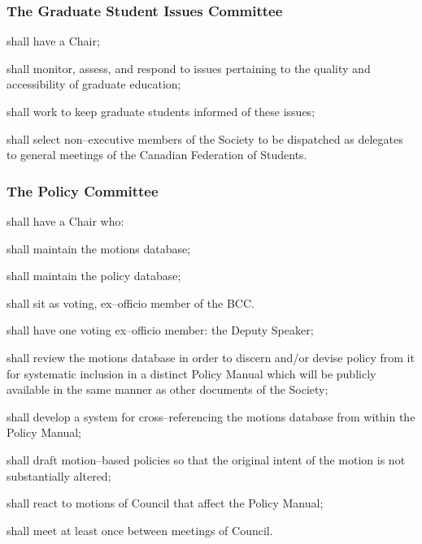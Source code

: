 \subsubsection{The Graduate Student Issues Committee}
\begin{longenum}[ label*=\thesubsubsection.\arabic*., align=left]
	\item shall have a Chair;
    \item shall monitor, assess, and respond to issues pertaining to the quality and accessibility of graduate education;
    \item shall work to keep graduate students informed of these issues;
    \item shall select non--executive members of the Society to be dispatched as delegates to general meetings of the Canadian Federation of Students.
\end{longenum}

\subsubsection{The Policy Committee}

\begin{longenum}[ label*=\thesubsubsection.\arabic*., align=left]
	\item shall have a Chair who:
    \begin{longenum}[ label*=\arabic*., align=left]
		\item shall maintain the motions database;
        \item shall maintain the policy database;
        \item shall sit as voting, ex--officio member of the BCC.
	\end{longenum}
    \item shall have one voting ex--officio member: the Deputy 
Speaker;
  
	\item shall review the motions database in order to discern and/or devise policy from it for systematic inclusion in a distinct Policy Manual which will be publicly available in the same manner as other documents of the Society;
    \item shall develop a system for cross--referencing the motions database from within the Policy Manual;
    \item shall draft motion--based policies so that the original intent of the motion is not substantially altered;
    \item shall react to motions of Council that affect the Policy Manual;
    \item shall meet at least once between meetings of Council.
    
\end{longenum}

